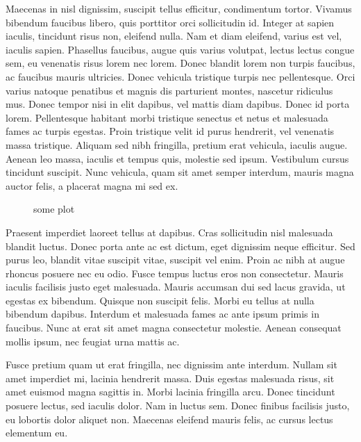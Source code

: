 \documentclass[9pt, letterpaper, twocolumn]{article}
\begin{document}
Maecenas in nisl dignissim, suscipit tellus efficitur, condimentum tortor. Vivamus bibendum faucibus libero, quis porttitor orci sollicitudin id. Integer at sapien iaculis, tincidunt risus non, eleifend nulla. Nam et diam eleifend, varius est vel, iaculis sapien. Phasellus faucibus, augue quis varius volutpat, lectus lectus congue sem, eu venenatis risus lorem nec lorem. Donec blandit lorem non turpis faucibus, ac faucibus mauris ultricies. Donec vehicula tristique turpis nec pellentesque. Orci varius natoque penatibus et magnis dis parturient montes, nascetur ridiculus mus. Donec tempor nisi in elit dapibus, vel mattis diam dapibus. Donec id porta lorem. Pellentesque habitant morbi tristique senectus et netus et malesuada fames ac turpis egestas. Proin tristique velit id purus hendrerit, vel venenatis massa tristique. Aliquam sed nibh fringilla, pretium erat vehicula, iaculis augue. Aenean leo massa, iaculis et tempus quis, molestie sed ipsum. Vestibulum cursus tincidunt suscipit. Nunc vehicula, quam sit amet semper interdum, mauris magna auctor felis, a placerat magna mi sed ex.

\begin{figure}[t]
  \centering
  \caption{some plot}
  \label{fig:mesh2}
\end{figure}

Praesent imperdiet laoreet tellus at dapibus. Cras sollicitudin nisl malesuada blandit luctus. Donec porta ante ac est dictum, eget dignissim neque efficitur. Sed purus leo, blandit vitae suscipit vitae, suscipit vel enim. Proin ac nibh at augue rhoncus posuere nec eu odio. Fusce tempus luctus eros non consectetur. Mauris iaculis facilisis justo eget malesuada. Mauris accumsan dui sed lacus gravida, ut egestas ex bibendum. Quisque non suscipit felis. Morbi eu tellus at nulla bibendum dapibus. Interdum et malesuada fames ac ante ipsum primis in faucibus. Nunc at erat sit amet magna consectetur molestie. Aenean consequat mollis ipsum, nec feugiat urna mattis ac.

Fusce pretium quam ut erat fringilla, nec dignissim ante interdum. Nullam sit amet imperdiet mi, lacinia hendrerit massa. Duis egestas malesuada risus, sit amet euismod magna sagittis in. Morbi lacinia fringilla arcu. Donec tincidunt posuere lectus, sed iaculis dolor. Nam in luctus sem. Donec finibus facilisis justo, eu lobortis dolor aliquet non. Maecenas eleifend mauris felis, ac cursus lectus elementum eu.
\end{document}
